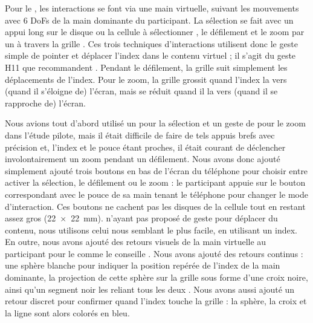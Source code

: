 
Pour le , les interactions se font via une main virtuelle, suivant les mouvements avec 6 DoFs de la main dominante du participant. La sélection se fait avec un appui long sur le disque ou la cellule à sélectionner , le défilement et le zoom par un  à travers la grille . Ces trois techniques d'interactions utilisent donc le geste simple de pointer et déplacer l'index dans le contenu virtuel ; il s'agit du geste H11 que \cite{Piumsomboon2013} recommandent . Pendant le défilement, la grille suit simplement les déplacements de l'index. Pour le zoom, la grille grossit quand l'index la  vers (quand il s'éloigne de) l'écran, mais se réduit quand il la  vers (quand il se rapproche de) l'écran.

Nous avions tout d'abord utilisé un  pour la sélection et un geste de  pour le zoom dans l'étude pilote, mais il était difficile de faire de tels appuis brefs avec précision et, l'index et le pouce étant proches, il était courant de déclencher involontairement un zoom pendant un défilement. Nous avons donc ajouté simplement ajouté trois boutons en bas de l'écran du téléphone pour choisir entre activer la sélection, le défilement ou le zoom : le participant appuie sur le bouton correspondant avec le pouce de sa main tenant le téléphone pour changer le mode d'interaction. Ces boutons ne cachent pas les disques de la cellule  tout en restant assez gros (\SI{22x22}{\mm}). \cite{Piumsomboon2013} n'ayant pas proposé de geste pour déplacer du contenu, nous utilisons celui nous semblant le plus facile, en utilisant un index. 
En outre, nous avons ajouté des retours visuels de la main virtuelle au participant pour le  comme le conseille \cite{Chan2010}. Nous avons ajouté des retours continus : une sphère blanche pour indiquer la position repérée de l'index de la main dominante, la projection de cette sphère sur la grille sous forme d'une croix noire, ainsi qu'un segment noir les reliant tous les deux . Nous avons aussi ajouté un retour discret pour confirmer quand l'index touche la grille : la sphère, la croix et la ligne sont alors colorés en bleu.

